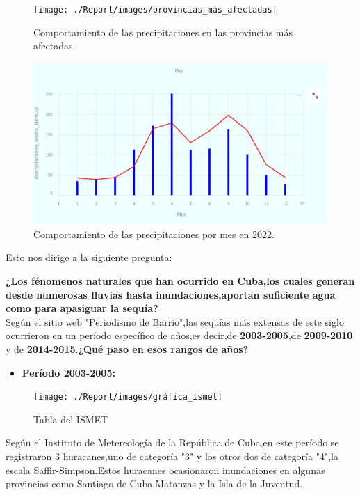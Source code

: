 \documentclass[12pt]{article}
\begin{document}
	\begin{figure}[H]
		\centering
		\texttt{[image: ./Report/images/provincias\_más\_afectadas]}
		\caption{Comportamiento de las precipitaciones en las provincias más afectadas.}
		\label{fig:provinciasmasafectadas}
	\end{figure}
	
	
	
	\begin{figure}[H]
		\centering
		\includegraphics[width=0.8\linewidth]{./Report/images/precipitaciones_2022}
		\caption{Comportamiento de las precipitaciones por mes en 2022.}
		\label{fig:precipitaciones2022}
	\end{figure}
	
	
	\newpage
	Esto nos dirige a la siguiente pregunta:
	
	\textbf{¿Los fénomenos naturales que han ocurrido en Cuba,los cuales generan desde numerosas lluvias hasta inundaciones,aportan suficiente agua como para apasiguar la sequía?}\\
	
	
	Según el sitio web "Periodismo de Barrio",las sequías más extensas de este siglo ocurrieron en un período específico de años,es decir,de \textbf{2003-2005},de \textbf{2009-2010} y de \textbf{2014-2015}.\textbf{¿Qué paso en esos rangos de años?}\cite{webpage3}
	
	\begin{itemize}
		\item\textbf{Período 2003-2005:}
	\end{itemize}
	
	\begin{figure}[H]
		\centering
		\texttt{[image: ./Report/images/gráfica\_ismet]}
		\caption{Tabla del ISMET}
		\label{fig:graficaismet}
	\end{figure}
	
	
	Según el Instituto de Metereología de la República de Cuba,en este período se registraron 3 huracanes,uno de categoría "3" y los otros dos de categoría "4",la escala Saffir-Simpson.Estos huracanes ocasionaron inundaciones en algunas provincias como Santiago de Cuba,Matanzas y la Isla de la Juventud.\cite{webpage4}
	
\end{document}
